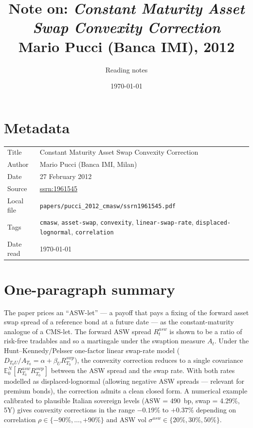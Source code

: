 \documentclass[11pt,a4paper]{article}
\title{Note on: \emph{Constant Maturity Asset Swap Convexity Correction}\\
       \large Mario Pucci (Banca IMI), 2012}
\author{Reading notes}
\date{\today}
\begin{document}
\maketitle

\section*{Metadata}
\begin{tabular}{@{}p{3.5cm}p{11cm}@{}}
\toprule
Title           & Constant Maturity Asset Swap Convexity Correction \\
Author          & Mario Pucci (Banca IMI, Milan) \\
Date            & 27 February 2012 \\
Source          & \href{https://ssrn.com/abstract=1961545}{ssrn:1961545} \\
Local file      & \texttt{papers/pucci\_2012\_cmasw/ssrn1961545.pdf} \\
Tags            & \texttt{cmasw}, \texttt{asset-swap}, \texttt{convexity},
                  \texttt{linear-swap-rate}, \texttt{displaced-lognormal}, \texttt{correlation} \\
Date read       & \today \\
\bottomrule
\end{tabular}

\section*{One-paragraph summary}
The paper prices an ``ASW-let'' --- a payoff that pays a fixing of the
forward asset swap spread of a reference bond at a future date --- as
the constant-maturity analogue of a CMS-let. The forward ASW spread
$R^{asw}_t$ is shown to be a ratio of risk-free tradables and so a
martingale under the swaption measure $A_t$. Under the
Hunt--Kennedy/Pelsser one-factor linear swap-rate model
($D_{T_0 U}/A_{T_0} = \alpha + \beta_U R^{swp}_{T_0}$), the convexity
correction reduces to a single covariance
$\mathbb{E}^N_0[R^{asw}_{T_0} R^{swp}_{T_0}]$ between the ASW spread
and the swap rate. With both rates modelled as displaced-lognormal
(allowing negative ASW spreads --- relevant for premium bonds), the
correction admits a clean closed form. A numerical example calibrated
to plausible Italian sovereign levels (ASW = 490~bp, swap = 4.29\%, 5Y)
gives convexity corrections in the range $-0.19\%$ to $+0.37\%$
depending on correlation $\rho \in \{-90\%, \ldots, +90\%\}$ and ASW
vol $\sigma^{asw} \in \{20\%, 30\%, 50\%\}$.
\end{document}
